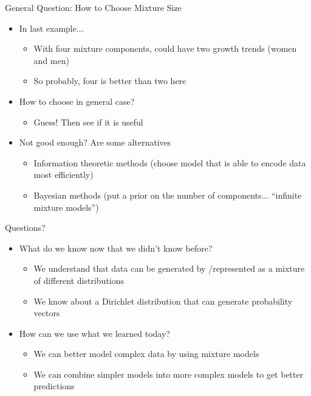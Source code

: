 \documentclass[aspectratio=169]{beamer}
\begin{document}
\begin{frame}{General Question: How to Choose Mixture Size}

\begin{itemize}
\item In last example...
\begin{itemize}
\item With four mixture components, could have two growth trends (women and men)
\item So probably, four is better than two here
\end{itemize}
\item How to choose in general case?
\begin{itemize}
\item Guess!  Then see if it is useful
\end{itemize}
\item Not good enough?  Are some alternatives
\begin{itemize}
\item Information theoretic methods (choose model that is able to encode data most efficiently)
\item Bayesian methods (put a prior on the number of components... ``infinite mixture models'')
\end{itemize}
\end{itemize}
	
\end{frame}
\begin{frame}{Questions?}
\begin{itemize}
	\item What do we know now that we didn't know before?
\begin{itemize}
	\item We understand that data can be generated by /represented as a mixture of different distributions
	\item We know about a Dirichlet distribution that can generate probability vectors
\end{itemize}

	\item How can we use what we learned today?
\begin{itemize}
	\item We can better model complex data by using mixture models
	\item We can combine simpler models into more complex models to get better predictions
\end{itemize}
\end{itemize}
\end{frame}
\end{document}
